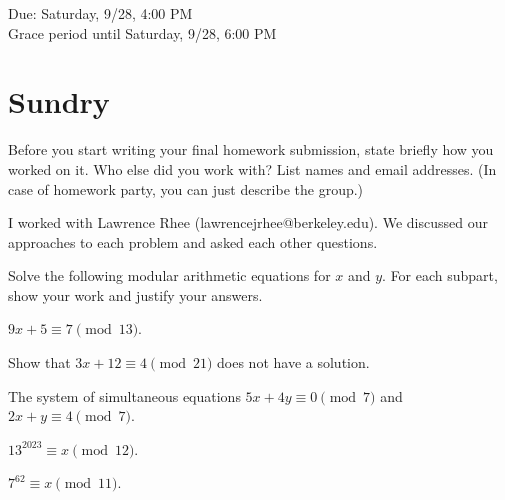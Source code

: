 \documentclass[11pt]{article}
\begin{document}
\maketitle
\fontsize{12}{15}\selectfont

\begin{center}
    Due: Saturday, 9/28, 4:00 PM \\
    Grace period until Saturday, 9/28, 6:00 PM \\
\end{center}

\section*{Sundry}
Before you start writing your final homework submission, state briefly how you worked on it.  Who else did you work with?  List names and email addresses.  (In case of homework party, you can just describe the group.)

\begin{solution}
  I worked with Lawrence Rhee (lawrencejrhee@berkeley.edu). 
  We discussed our approaches to each problem and asked each other questions.  
\end{solution}
\vspace{15pt}


Solve the following modular arithmetic equations for $x$ and $y$. For each subpart, show your work and justify your answers.
\begin{Parts}
\Part $9x+5 \equiv 7 \pmod{13}$.

\Part Show that $3x+12 \equiv 4 \pmod{21}$ does not have a solution.

\Part The system of simultaneous equations
$5x+4y \equiv 0 \pmod{7}$ and $2x+y \equiv 4 \pmod{7}$.

\Part $13^{2023} \equiv x \pmod{12}$.

\Part $7^{62} \equiv x \pmod{11}$.

\end{Parts}
\end{document}
